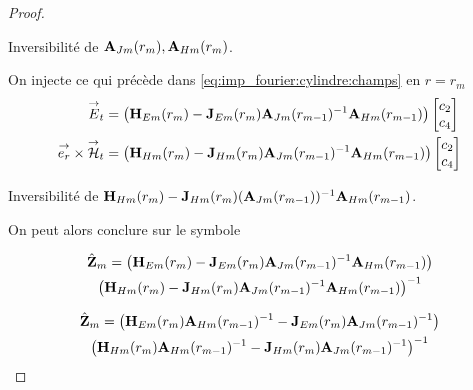 \begin{proof}
            \begin{TODO}
              Inversibilité de \(\mathbf{A}_{Jm}(r_m), \mathbf{A}_{Hm}(r_m)\).
            \end{TODO}

            On injecte ce qui précède dans \eqref{eq:imp_fourier:cylindre:champs} en \(r = r_{m}\)
            \begin{align}
                {\overset{\rightarrow}{E}}_t &= 
                \left(\mathbf{H}_{Em}(r_{m}) - \mathbf{J}_{Em}(r_{m})\mathbf{A}_{Jm}(r_{m-1})^{-1}\mathbf{A}_{Hm}(r_{m-1})\right)
                \begin{bmatrix}
                    c_2 \\
                    c_4
                \end{bmatrix}
                \\
                {\overset{\rightarrow}{e_r}}\times{\overset{\rightarrow}{\mathcal{H}}}_t &= 
                \left(\mathbf{H}_{Hm}(r_{m}) - \mathbf{J}_{Hm}(r_{m})\mathbf{A}_{Jm}(r_{m-1})^{-1}\mathbf{A}_{Hm}(r_{m-1}) \right)
                \begin{bmatrix}
                    c_2 \\
                    c_4
                \end{bmatrix}
            \end{align}

            \begin{TODO}
              Inversibilité de \(\mathbf{H}_{Hm}(r_m) - \mathbf{J}_{Hm}(r_m)(\mathbf{A}_{Jm}(r_{m-1}))^{-1}\mathbf{A}_{Hm}(r_{m-1})\).
            \end{TODO}

            On peut alors conclure sur le symbole

            \begin{multline}
                \hat {\mathbf{Z}}_{m} = 
                    \left(\mathbf{H}_{Em}(r_m) - \mathbf{J}_{Em}(r_m)\mathbf{A}_{Jm}(r_{m-1})^{-1}\mathbf{A}_{Hm}(r_{m-1})\right) \\
                    \left(\mathbf{H}_{Hm}(r_m) - \mathbf{J}_{Hm}(r_m)\mathbf{A}_{Jm}(r_{m-1})^{-1}\mathbf{A}_{Hm}(r_{m-1})\right)^{-1}
            \end{multline}

            \begin{multline}
                \hat {\mathbf{Z}}_{m} =
                    \left(\mathbf{H}_{Em}(r_m)\mathbf{A}_{Hm}(r_{m-1})^{-1} - \mathbf{J}_{Em}(r_m)\mathbf{A}_{Jm}(r_{m-1})^{-1}\right) \\
                    \left(\mathbf{H}_{Hm}(r_m)\mathbf{A}_{Hm}(r_{m-1})^{-1} - \mathbf{J}_{Hm}(r_m)\mathbf{A}_{Jm}(r_{m-1})^{-1}\right)^{-1}
            \end{multline}

        \end{proof}

